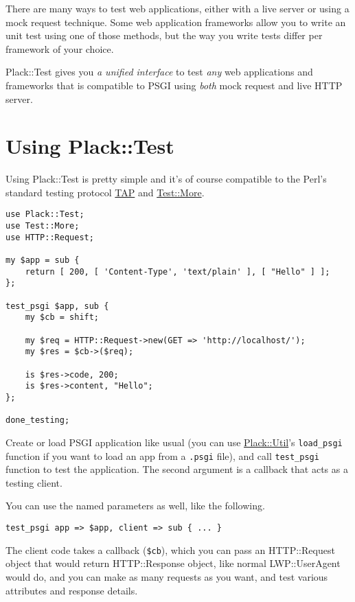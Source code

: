 There are many ways to test web applications, either with a live server
or using a mock request technique. Some web application frameworks allow
you to write an unit test using one of those methods, but the way you
write tests differ per framework of your choice.

Plack::Test gives you \emph{a unified interface} to test \emph{any} web
applications and frameworks that is compatible to PSGI using \emph{both}
mock request and live HTTP server.

\section{Using Plack::Test}\label{using-placktest}

Using Plack::Test is pretty simple and it's of course compatible to the
Perl's standard testing protocol
\href{http://testanything.org/wiki/}{TAP} and
\href{http://search.cpan.org/perldoc?Test::More}{Test::More}.

\begin{lstlisting}
use Plack::Test;
use Test::More;
use HTTP::Request;

my $app = sub {
    return [ 200, [ 'Content-Type', 'text/plain' ], [ "Hello" ] ];
};

test_psgi $app, sub {
    my $cb = shift;
    
    my $req = HTTP::Request->new(GET => 'http://localhost/');
    my $res = $cb->($req);
    
    is $res->code, 200;
    is $res->content, "Hello";
};

done_testing;
\end{lstlisting}

Create or load PSGI application like usual (you can use
\href{http://search.cpan.org/perldoc?Plack::Util}{Plack::Util}'s
\lstinline!load_psgi! function if you want to load an app from a
\lstinline!.psgi! file), and call \lstinline!test_psgi! function to test
the application. The second argument is a callback that acts as a
testing client.

You can use the named parameters as well, like the following.

\begin{lstlisting}
test_psgi app => $app, client => sub { ... }
\end{lstlisting}

The client code takes a callback (\lstinline!$cb!), which you can pass
an HTTP::Request object that would return HTTP::Response object, like
normal LWP::UserAgent would do, and you can make as many requests as you
want, and test various attributes and response details.

